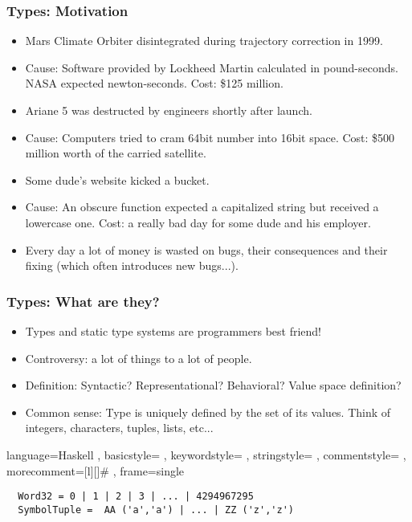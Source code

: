 \documentclass[11pt]{beamer}
\begin{document}
	\begin{frame}
		\frametitle{Types: Motivation}
			\begin{itemize}[<+->]
				\item Mars Climate Orbiter disintegrated during trajectory correction in 1999.
				\item Cause: Software provided by Lockheed Martin calculated in pound-seconds. NASA expected newton-seconds. Cost: \$125 million.
				\item Ariane 5 was destructed by engineers shortly after launch.
				\item Cause: Computers tried to cram 64bit number into 16bit space. Cost: \$500 million worth of the carried satellite.
				\item Some dude's website kicked a bucket.
				\item Cause: An obscure function expected a capitalized string but received a lowercase one. Cost: a really bad day for some dude and his employer.
				\item Every day a lot of money is wasted on bugs, their consequences and their fixing (which often introduces new bugs...).
			\end{itemize}
	\end{frame}

\begin{frame}[fragile]
	\frametitle{Types: What are they?}
	\begin{itemize}[<+->]
		\item Types and static type systems are programmers best friend!
		\item Controversy: a lot of things to a lot of people. 
		\item Definition: Syntactic? Representational? Behavioral? Value space definition?
		\item Common sense: Type is uniquely defined by the set of its values. Think of integers, characters, tuples, lists, etc...
	\end{itemize}
\lstset
{ language=Haskell
	, basicstyle=\ttfamily\footnotesize
	, keywordstyle=\color{blue}\ttfamily
	, stringstyle=\color{red}\ttfamily
	, commentstyle=\color{green}\ttfamily
	, morecomment=[l][\color{magenta}]{\#}
	, frame=single
}
\pause
\begin{lstlisting}
  Word32 = 0 | 1 | 2 | 3 | ... | 4294967295
  SymbolTuple =  AA ('a','a') | ... | ZZ ('z','z')
\end{lstlisting}	
\end{frame}
\end{document}
